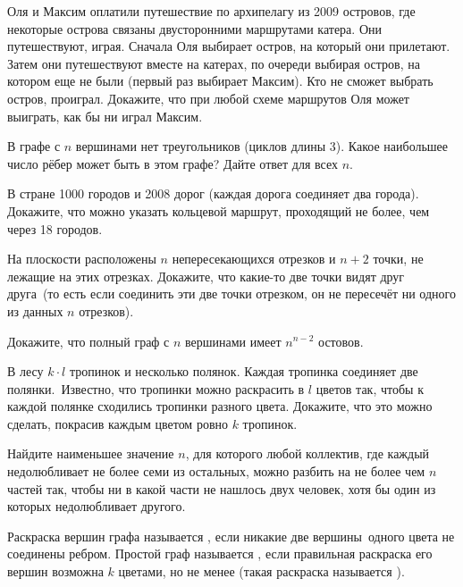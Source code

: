 \documentclass[a4paper,11pt]{article}
\begin{document}
Оля и Максим оплатили путешествие по архипелагу из 2009 островов, где
некоторые острова связаны двусторонними маршрутами катера.
Они путешествуют, играя. Сначала Оля выбирает остров, на который они
прилетают. Затем они путешествуют вместе на катерах,
по очереди выбирая остров, на котором еще не были
(первый раз выбирает Максим). Кто не сможет выбрать остров,
проиграл. Докажите, что при любой схеме маршрутов Оля может выиграть,
как бы ни играл Максим.


В графе с $n$ вершинами нет треугольников (циклов длины 3).
Какое наибольшее число рёбер может быть в этом графе?
Дайте ответ для всех $n$.


В стране 1000 городов и 2008 дорог (каждая дорога соединяет
два города). Докажите, что можно указать кольцевой маршрут,
проходящий не более, чем через 18 городов.

На плоскости расположены $n$ непересекающихся отрезков и $n+2$ точки,
не лежащие на этих отрезках. Докажите, что какие-то две точки  видят
друг друга\ (то есть если соединить эти две точки отрезком, он не пересечёт
ни одного из данных $n$ отрезков).

Докажите, что полный граф с $n$ вершинами имеет $n^{n-2}$ остовов.



\vspace*{-1truemm}

\vspace*{-1truemm}
В лесу $k\cdot l$ тропинок и несколько полянок.
Каждая тропинка соединяет две полянки.~Из\-вес\-т\-но, что
тропинки можно раскрасить в $l$ цветов так, чтобы к каждой
полянке сходились тропин\-ки разного цвета. Докажите, что это
можно сделать, покрасив каждым цветом ровно $k$ тропинок.

Найдите наименьшее значение $n$, для которого любой коллектив,
где каждый недолюбливает не более семи из остальных, можно разбить
на не более чем $n$ частей так, чтобы ни в какой части не нашлось
двух человек, хотя бы один из которых недолюбливает другого.


 Раскраска вершин графа называется , если
никакие две вершины~од\-но\-го цвета не соединены ребром.
Простой граф
называется , если правильная раскраска его вершин
возможна $k$ цветами, но не менее
(такая раскраска называется ).
\end{document}
